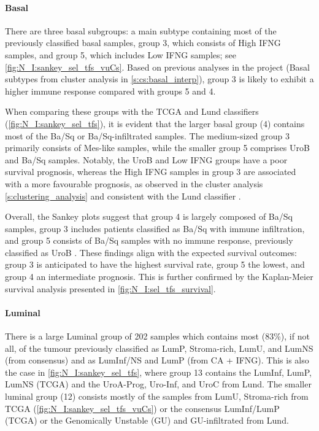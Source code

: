 \paragraph*{Basal}

There are three basal subgroups: a main subtype containing most of the previously classified basal samples, group 3, which consists of High IFNG samples, and group 5, which includes Low IFNG samples; see \cref{fig:N_I:sankey_sel_tfs_vuCs}. Based on previous analyses in the project (Basal subtypes from cluster analysis in \cref{s:cs:basal_interp}), group 3 is likely to exhibit a higher immune response compared with groups 5 and 4.

When comparing these groups with the TCGA and Lund classifiers (\cref{fig:N_I:sankey_sel_tfs}), it is evident that the larger basal group (4) contains most of the Ba/Sq or Ba/Sq-infiltrated samples. The medium-sized group 3 primarily consists of Mes-like samples, while the smaller group 5 comprises UroB and Ba/Sq samples. Notably, the UroB and Low IFNG groups have a poor survival prognosis, whereas the High IFNG samples in group 3 are associated with a more favourable prognosis, as observed in the cluster analysis \cref{s:clustering_analysis} and consistent with the Lund classifier \citep{Marzouka2018-ge}.

Overall, the Sankey plots suggest that group 4 is largely composed of Ba/Sq samples, group 3 includes patients classified as Ba/Sq with immune infiltration, and group 5 consists of Ba/Sq samples with no immune response, previously classified as UroB \citep{Marzouka2018-ge}. These findings align with the expected survival outcomes: group 3 is anticipated to have the highest survival rate, group 5 the lowest, and group 4 an intermediate prognosis. This is further confirmed by the Kaplan-Meier survival analysis presented in \cref{fig:N_I:sel_tfs_survival}.

\paragraph*{Luminal}

There is a large Luminal group of 202 samples which contains most (83\%), if not all, of the tumour previously classified as LumP, Stroma-rich, LumU, and LumNS (from consensus) and as LumInf/NS and LumP (from CA + IFNG). This is also the case in \cref{fig:N_I:sankey_sel_tfs}, where group 13 contains the LumInf, LumP, LumNS (TCGA) and the UroA-Prog, Uro-Inf, and UroC from Lund. The smaller luminal group (12) consists mostly of the samples from LumU, Stroma-rich from TCGA (\cref{fig:N_I:sankey_sel_tfs_vuCs}) or the consensus LumInf/LumP (TCGA) or the Genomically Unstable (GU) and GU-infiltrated from Lund.


